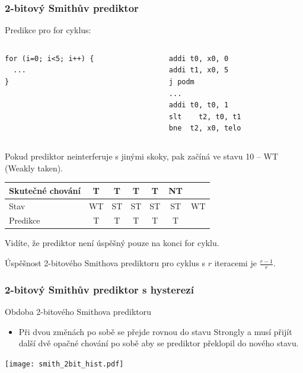 \documentclass{beamer}
\begin{document}
\begin{frame}[fragile]
\frametitle{2-bitový Smithův prediktor}

Predikce pro for cyklus:

\begin{columns}[T]
\begin{column}{0.4\textwidth}
\begin{verbatim}
for (i=0; i<5; i++) {
  ...
}
\end{verbatim}
\end{column}
\hfill
\begin{column}{0.4\textwidth}
\begin{verbatim}
addi t0, x0, 0
addi t1, x0, 5
j podm
...
addi t0, t0, 1
slt    t2, t0, t1
bne  t2, x0, telo
\end{verbatim}
\end{column}
\end{columns}
\bigskip
\small
Pokud prediktor neinterferuje s jinými skoky, pak začíná ve stavu 10 -- WT (Weakly taken).

\begin{tabular}{|l|c|c|c|c|c|c|}\hline
Skutečné chování & T & T & T & T & NT &\\ \hline
Stav & WT & ST & ST & ST & ST & WT\\ \hline
Predikce         & T & T & T & T & {\color{red}T} &\\ \hline
\end{tabular}

Vidíte, že prediktor není úspěšný pouze na konci for cyklu.

Úspěšnost 2-bitového Smithova prediktoru pro cyklus s $r$ iteracemi je $\frac{r-1}{r}$.
\end{frame}


\begin{frame}
\frametitle{2-bitový Smithův prediktor s hysterezí}

Obdoba 2-bitového Smithova prediktoru
\begin{itemize}
\item Při dvou změnách po sobě se přejde rovnou do stavu Strongly a musí přijít další dvě opačné chování po sobě aby se prediktor překlopil do nového stavu.
\end{itemize}

\begin{center}
\texttt{[image: smith\_2bit\_hist.pdf]}
\end{center}
\end{frame}
\end{document}
